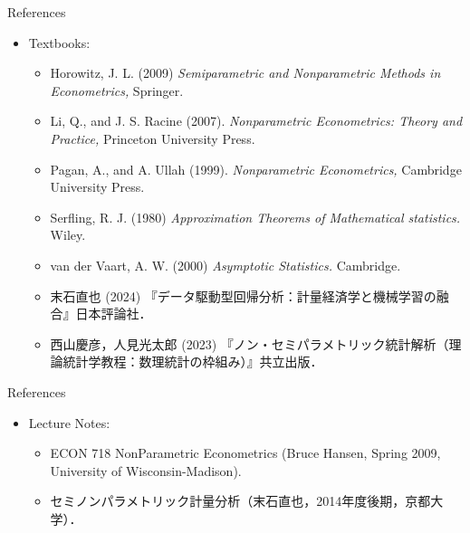 \documentclass[xcolor=svgnames,dvipdfmx,cjk]{beamer}
\theoremstyle{example}
\begin{document}
\begin{frame}{References}
  \begin{itemize}
    \item Textbooks:
    \begin{itemize}
      \item Horowitz, J. L. (2009)
            \textit{Semiparametric and Nonparametric Methods in Econometrics,}
            Springer.
      \item Li, Q., and J. S. Racine (2007). 
            \textit{Nonparametric Econometrics: Theory and Practice,} 
            Princeton University Press.
      \item Pagan, A., and A. Ullah (1999).
            \textit{Nonparametric Econometrics,}
            Cambridge University Press.
      \item Serfling, R. J. (1980)
            \textit{Approximation Theorems of Mathematical statistics.} Wiley.
      \item van der Vaart, A. W. (2000)
            \textit{Asymptotic Statistics.} Cambridge.
      \item 末石直也 (2024) 『データ駆動型回帰分析：計量経済学と機械学習の融合』日本評論社．
      \item 西山慶彦，人見光太郎 (2023) 『ノン・セミパラメトリック統計解析（理論統計学教程：数理統計の枠組み）』共立出版．
    \end{itemize}
  \end{itemize}
\end{frame}

\begin{frame}{References}
\begin{itemize}
  \item Lecture Notes:
  \begin{itemize}
    \item ECON 718 NonParametric Econometrics (Bruce Hansen, Spring 2009, University of Wisconsin-Madison).
    \item セミノンパラメトリック計量分析（末石直也，2014年度後期，京都大学）．
  \end{itemize}
\end{itemize}
\end{frame}
\end{document}
